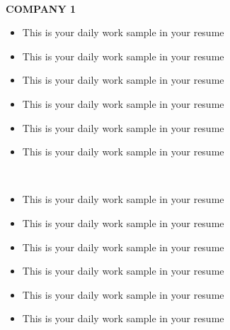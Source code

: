 \documentclass{ctexart}
\theoremstyle{plain}
\begin{document}
\begin{paracol}{2}
	
	
	
	
		
	\\
	\hspace*{.05\linewidth}
	{
	\MakeUppercase{\small\textbf{Company 1}}
	}
	
	\begin{itemize}
		\item{\normalsize{This is your daily work sample in your resume}}
		\item{\normalsize{This is your daily work sample in your resume}}
		\item{\normalsize{This is your daily work sample in your resume}}
		\item{\normalsize{This is your daily work sample in your resume}}
		\item{\normalsize{This is your daily work sample in your resume}}
		\item{\normalsize{This is your daily work sample in your resume}}
	\end{itemize}
	
		
	\\
	\begin{itemize}
		\item{\normalsize{This is your daily work sample in your resume}}
		\item{\normalsize{This is your daily work sample in your resume}}
		\item{\normalsize{This is your daily work sample in your resume}}
		\item{\normalsize{This is your daily work sample in your resume}}
		\item{\normalsize{This is your daily work sample in your resume}}
		\item{\normalsize{This is your daily work sample in your resume}}
	\end{itemize}
	
	\\


\end{paracol}
\end{document}
